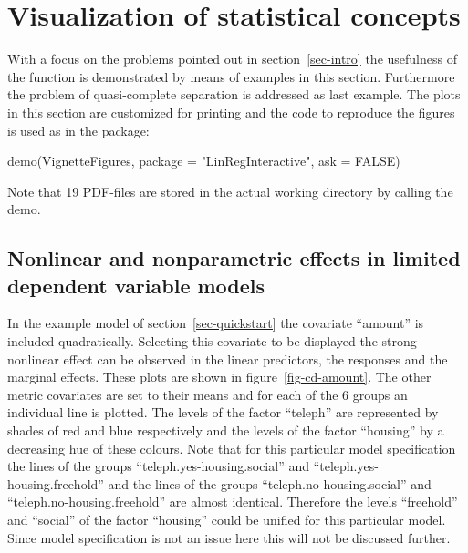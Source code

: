 \documentclass[nojss]{jss}
\newcommand{\quotes}[1]{``#1''}
\begin{document}
\section{Visualization of statistical concepts} \label{sec-visualization}
With a focus on the problems pointed out in section~\ref{sec-intro} the usefulness of the function is demonstrated by means of examples in this section. Furthermore the problem of quasi-complete separation is addressed as last example. The plots in this section are customized for printing and the code to reproduce the figures is used as  in the package:
%
\begin{Schunk}
\begin{Sinput}
 demo(VignetteFigures, package = "LinRegInteractive", ask = FALSE)
\end{Sinput}
\end{Schunk}
%
Note that 19 PDF-files are stored in the actual working directory by calling the demo.

\subsection{Nonlinear and nonparametric effects in limited dependent variable models}
In the example model of section~\ref{sec-quickstart} the covariate \quotes{amount} is included quadratically. 
Selecting this covariate to be displayed the strong nonlinear effect can be observed in the linear predictors, the responses and the marginal
effects. These  plots are shown in figure~\ref{fig-cd-amount}. The other metric covariates are set to their means and for each of the 6 groups an individual line is plotted. The levels of the factor \quotes{teleph} are represented by shades of red and blue respectively and the levels of the factor \quotes{housing} by a decreasing hue of these colours.  Note that for this particular model specification the lines of the groups \quotes{teleph.yes-housing.social} and \quotes{teleph.yes-housing.freehold} and the lines of the groups \quotes{teleph.no-housing.social} and \quotes{teleph.no-housing.freehold} are almost identical. Therefore the levels \quotes{freehold} and \quotes{social} of the factor \quotes{housing} could be unified for this particular model. Since model specification is not an issue here this will not be discussed further.  
\end{document}
